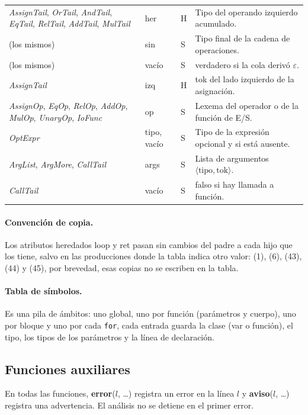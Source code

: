 \documentclass[11pt]{article}
\newcommand{\NT}[1]{\textcolor{ntcolor}{\textit{#1}}}            %
\newcommand{\T}[1]{\textcolor{tcolor}{\texttt{#1}}}              %
\newcommand{\fn}[1]{\textsf{\textbf{#1}}}                        %
\begin{document}
\begin{longtable}{@{}>{\raggedright\arraybackslash}p{4.6cm}>{\raggedright\arraybackslash}p{1.8cm}p{1.3cm}>{\raggedright\arraybackslash}p{7.6cm}@{}}
\NT{AssignTail}, \NT{OrTail}, \NT{AndTail}, \NT{EqTail}, \NT{RelTail}, \NT{AddTail}, \NT{MulTail} & \textsf{her} & H & Tipo del operando izquierdo acumulado. \\
(los mismos) & \textsf{sin} & S & Tipo final de la cadena de operaciones. \\
(los mismos) & \textsf{vacío} & S & \textsf{verdadero} si la cola derivó $\varepsilon$. \\
\NT{AssignTail} & \textsf{izq} & H & \textsf{tok} del lado izquierdo de la asignación. \\
\NT{AssignOp}, \NT{EqOp}, \NT{RelOp}, \NT{AddOp}, \NT{MulOp}, \NT{UnaryOp}, \NT{IoFunc} & \textsf{op} & S & Lexema del operador o de la función de E/S. \\
\NT{OptExpr} & \textsf{tipo}, \textsf{vacío} & S & Tipo de la expresión opcional y si está ausente. \\
\NT{ArgList}, \NT{ArgMore}, \NT{CallTail} & \textsf{args} & S & Lista de argumentos $\langle \text{tipo}, \text{tok}\rangle$. \\
\NT{CallTail} & \textsf{vacío} & S & \textsf{falso} si hay llamada a función. \\
\end{longtable}

\paragraph{Convención de copia.} Los atributos heredados \textsf{loop} y \textsf{ret} pasan sin cambios del padre a cada hijo que los tiene, salvo en las producciones donde la tabla indica otro valor: (1), (6), (43), (44) y (45), por brevedad, esas copias no se escriben en la tabla.

\paragraph{Tabla de símbolos.} Es una pila de ámbitos: uno global, uno por función (parámetros y cuerpo), uno por bloque y uno por cada \T{for}, cada entrada guarda la clase (\textsf{var} o \textsf{función}), el tipo, los tipos de los parámetros y la línea de declaración.

\subsection{Funciones auxiliares}

En todas las funciones, \fn{error}($l$, \dots) registra un error en la línea $l$ y \fn{aviso}($l$, \dots) registra una advertencia. El análisis no se detiene en el primer error.
\end{document}
